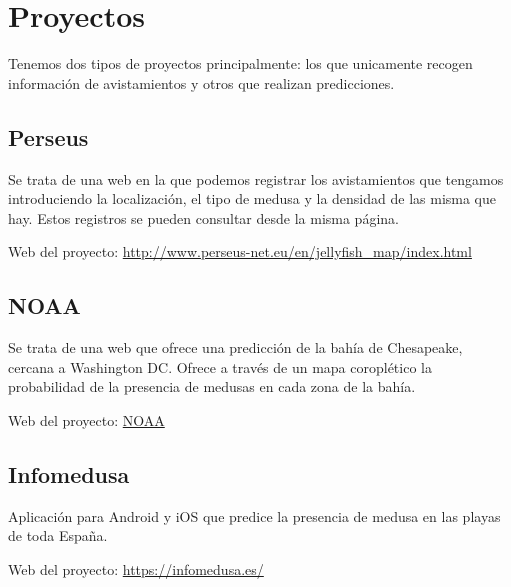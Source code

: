 \section{Proyectos}

Tenemos dos tipos de proyectos principalmente: los que unicamente recogen información de avistamientos y otros que realizan predicciones.

\subsection{Perseus}

Se trata de una web en la que podemos registrar los avistamientos que tengamos introduciendo la localización, el tipo de medusa y la densidad de las misma que hay.
Estos registros se pueden consultar desde la misma página.

Web del proyecto: \href{http://www.perseus-net.eu/en/jellyfish_map/index.html}{http://www.perseus-net.eu/en/jellyfish\_map/index.html}

\subsection{NOAA}

Se trata de una web que ofrece una predicción de la bahía de Chesapeake, cercana a Washington DC. Ofrece a través de un mapa coroplético la probabilidad de la presencia de medusas en cada zona de la bahía.

Web del proyecto: \href{https://ocean.weather.gov/Loops/ocean_guidance.php?model=Sea_Nettles&area=Prob&plot=prob&day=0&loop=1}{NOAA}

\subsection{Infomedusa}

Aplicación para Android y iOS que predice la presencia de medusa en las playas de toda España.

Web del proyecto: \href{https://infomedusa.es/}{https://infomedusa.es/}